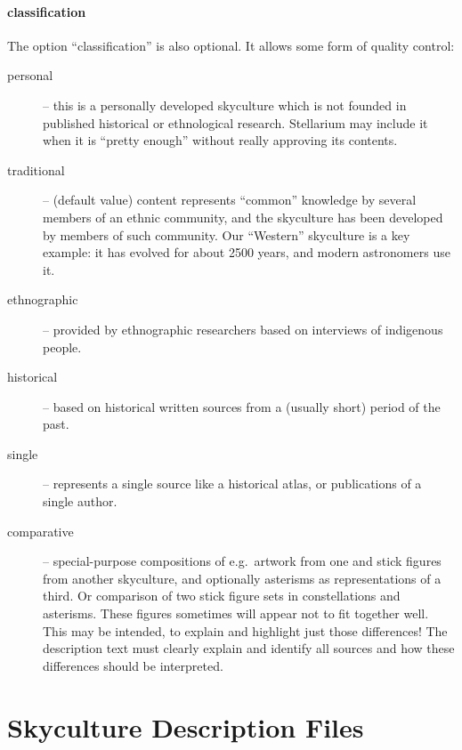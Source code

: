 \paragraph{classification}
The option ``classification'' is also optional.  It allows some form of quality control:
\begin{description}
  \item[personal] -- this is a personally developed skyculture which
    is not founded in published historical or ethnological research. Stellarium
    may include it when it is ``pretty enough'' without really
    approving its contents.
  \item[traditional] -- (default value) content represents ``common'' knowledge by
    several members of an ethnic community, and the skyculture has
    been developed by members of such community. Our ``Western''
    skyculture is a key example: it has evolved for about 2500 years,
    and modern astronomers use it.
  \item[ethnographic] -- provided by ethnographic researchers based on
    interviews of indigenous people.
  \item[historical] -- based on historical written sources from a
    (usually short) period of the past.
  \item[single] -- represents a single source like a historical atlas,
    or publications of a single author.
  \item[comparative] -- special-purpose compositions  of e.g.\ artwork
    from one and stick figures from another skyculture, and optionally
    asterisms as representations of a third. Or comparison of two
    stick figure sets in constellations and asterisms. These figures
    sometimes will appear not to fit together well. This may be
    intended, to explain and highlight just those differences! The
    description text must clearly explain and identify all sources and
    how these differences should be interpreted.
\end{description}


\section{Skyculture Description Files}
\label{sec:skycultures:description}


